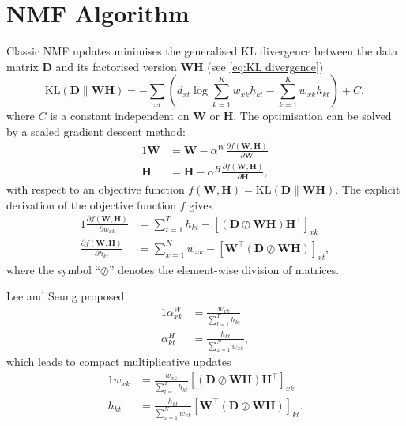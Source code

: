 \chapter{NMF Algorithm\label{app:NMF-algorithm}}

Classic NMF updates \cite{Lee2001} minimises the generalised KL divergence between the data matrix $\bm{D}$ and its factorised version $\bm{WH}$ (see \autoref{eq:KL divergence})
%
\begin{equation}
	\mbox{KL}(\bm{D}\parallel\bm{WH})=-\sum_{xt}\left(d_{xt}\log\sum_{k=1}^Kw_{xk}h_{kt}-\sum_{k=1}^Kw_{xk}h_{kt}\right)+C,
	\label{app-eq:KL}
\end{equation}
where $C$ is a constant independent on $\bm{W}$ or $\bm{H}$. The optimisation can be solved by a scaled gradient descent method:
%
\begin{alignat}{1}
	\bm{W} & =\bm{W}-\alpha^{W}\frac{\partial f(\bm{W,H})}{\partial \bm{W}}\nonumber \\
	\bm{H} & =\bm{H}-\alpha^{H}\frac{\partial f(\bm{W,H})}{\partial \bm{H}},
	\label{eq:gradient descend}
\end{alignat}
%
with respect to an objective function $f(\bm{W,H})=\mbox{KL}(\bm{D}\parallel\bm{WH})$. The explicit derivation of the objective function $f$ gives
%
\begin{alignat}{1}
	\frac{\partial f(\bm{W,H})}{\partial w_{xk}} & =\sum_{t=1}^T h_{kt}-\left[(\bm{D}\oslash\bm{WH})\bm{H}^{\top}\right]_{xk}\nonumber \\
	\frac{\partial f(\bm{W,H})}{\partial h_{kt}} & =\sum_{x=1}^N w_{xk}-\left[\bm{W^{\top}}(\bm{D}\oslash\bm{WH})\right]_{xt},
	\label{eq:gradients}
\end{alignat}
%
where the symbol ``$\oslash$'' denotes the element-wise division of matrices. 

Lee and Seung \cite{Lee2001} proposed 
%
\begin{alignat}{1}
	\alpha_{xk}^{W} & =\frac{w_{xk}}{\sum_{t=1}^Th_{kt}}\nonumber \\
	\alpha_{kt}^{H} & =\frac{h_{kt}}{\sum_{x=1}^Nw_{xk}},
	\label{eq:alphas}
\end{alignat}
%
which leads to compact multiplicative updates
%
\begin{alignat}{1}
	w_{xk} & =\frac{w_{xk}}{\sum_{t=1}^Th_{kt}}\left[(\bm{D}\oslash\bm{WH})\bm{H^{\top}}\right]_{xk}\nonumber \\
	h_{kt} & =\frac{h_{kt}}{\sum_{x=1}^Nw_{xk}}\left[\bm{W^{\top}}(\bm{D}\oslash\bm{WH})\right]_{kt}.
	\label{eq:classic updates}
\end{alignat}
%


